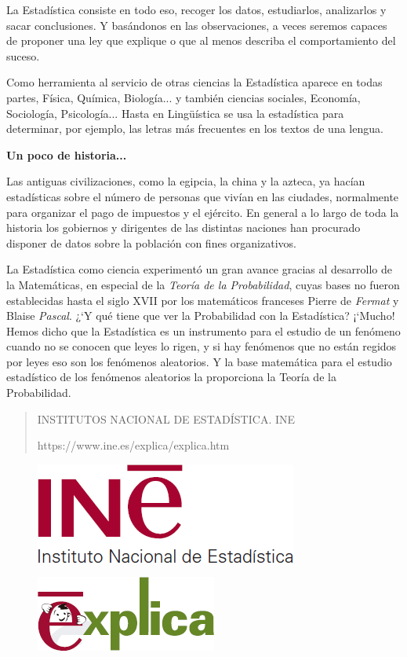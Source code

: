 La Estadística consiste en todo eso, recoger los datos, estudiarlos, analizarlos y sacar conclusiones. Y basándonos en las observaciones, a veces seremos capaces de proponer una ley que explique o que al menos describa el comportamiento del suceso. 

Como herramienta al servicio de otras ciencias la Estadística aparece en todas partes, Física, Química, Biología... y también ciencias sociales, Economía, Sociología, Psicología...  Hasta en Lingüística se usa la estadística para determinar, por ejemplo, las letras más frecuentes en los textos de una lengua.  

\textbf{Un poco de historia...} 

Las antiguas civilizaciones, como la egipcia, la china y la azteca, ya hacían estadísticas sobre el número de personas que vivían en las ciudades, normalmente para organizar el pago de impuestos y el ejército. En general a lo largo de toda la historia los gobiernos y dirigentes de las distintas naciones han procurado disponer de datos sobre la población con fines organizativos. 

La Estadística como ciencia experimentó un gran avance gracias al desarrollo de la Matemáticas, en especial de la \emph{Teoría de la Probabilidad}, cuyas bases no fueron establecidas hasta el siglo XVII por los matemáticos franceses Pierre de \emph{Fermat} y Blaise \emph{Pascal}. ¿`Y qué tiene que ver la Probabilidad con la Estadística? ¡`Mucho! Hemos dicho que la Estadística es un instrumento para el estudio de un fenómeno cuando no se conocen que leyes lo rigen, y si hay fenómenos que no están regidos por leyes eso son los fenómenos aleatorios. Y la base matemática para el estudio estadístico de los fenómenos aleatorios la proporciona la Teoría de la Probabilidad. 

\begin{footnotesize}
\begin{quotation}
	\textcolor{gris}{INSTITUTOS NACIONAL DE ESTADÍSTICA. \textsf{INE}}
	
	\textcolor{gris}{https://www.ine.es/explica/explica.htm}
	
\end{quotation}
\end{footnotesize}

\begin{multicols}{2}
\begin{figure}[H]
	\centering
	\includegraphics[width=.3\textwidth]{imagenes/imagenes00/T01IM03.png}
\end{figure}
\begin{figure}[H]
	\centering
	\includegraphics[width=.3\textwidth]{imagenes/imagenes00/T01IM02.png}
\end{figure}
\end{multicols}


